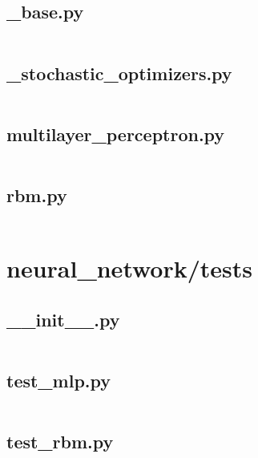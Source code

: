 \documentclass{article}
\begin{document}
\subsection{\_base.py}
\inputminted{python}{/home/dufferzafar/dev/@clones/scikit-learn/sklearn/neural_network/_base.py}
\newpage

\subsection{\_stochastic\_optimizers.py}
\inputminted{python}{/home/dufferzafar/dev/@clones/scikit-learn/sklearn/neural_network/_stochastic_optimizers.py}
\newpage

\subsection{multilayer\_perceptron.py}
\inputminted{python}{/home/dufferzafar/dev/@clones/scikit-learn/sklearn/neural_network/multilayer_perceptron.py}
\newpage

\subsection{rbm.py}
\inputminted{python}{/home/dufferzafar/dev/@clones/scikit-learn/sklearn/neural_network/rbm.py}
\newpage

\section{neural\_network/tests}

\subsection{\_\_init\_\_.py}
\inputminted{python}{/home/dufferzafar/dev/@clones/scikit-learn/sklearn/neural_network/tests/__init__.py}
\newpage

\subsection{test\_mlp.py}
\inputminted{python}{/home/dufferzafar/dev/@clones/scikit-learn/sklearn/neural_network/tests/test_mlp.py}
\newpage

\subsection{test\_rbm.py}
\inputminted{python}{/home/dufferzafar/dev/@clones/scikit-learn/sklearn/neural_network/tests/test_rbm.py}
\newpage
\end{document}
